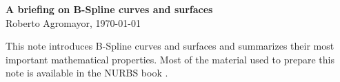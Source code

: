 \documentclass[11pt]{article}
\begin{document}
\thispagestyle{empty}

\begin{center}
{\LARGE \bf A briefing on B-Spline curves and surfaces}\\
\vspace{2ex}
{\large Roberto Agromayor, \today }\\
\end{center}

This note introduces B-Spline curves and surfaces and summarizes their most important mathematical properties. Most of the material used to prepare this note is available in the NURBS book \parencite[Chapters 2 and 3]{NURBS_book}.


\clearpage



 \printbibliography
\end{document}
